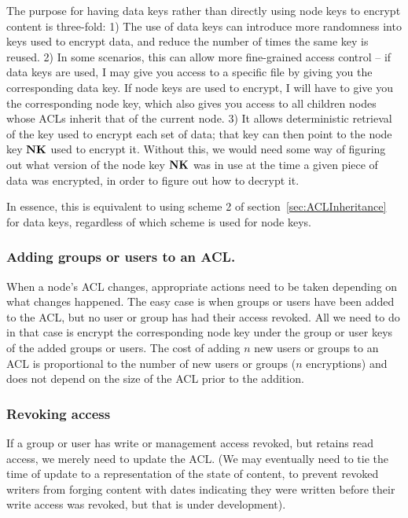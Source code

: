 The purpose for having data keys rather than directly using node keys
to encrypt content is three-fold: 1) The use of data keys can
introduce more randomness into keys used to encrypt data, and reduce
the number of times the same key is reused. 2) In some scenarios, this
can allow more fine-grained access control -- if data keys are used, I
may give you access to a specific file by giving you the corresponding
data key. If node keys are used to encrypt, I will have to give you
the corresponding node key, which also gives you access to all
children nodes whose ACLs inherit that of the current node. 3) It
allows deterministic retrieval of the key used to encrypt each set of
data; that key can then point to the node key ${\textbf{NK}}$ used to encrypt
it. Without this, we would need some way of figuring out what version
of the node key ${\textbf{NK}}$ was in use at the time a given piece of data was
encrypted, in order to figure out how to decrypt it.

In essence, this is equivalent to using scheme 2 of
section~\ref{sec:ACLInheritance} for data keys, regardless of which
scheme is used for node keys.


\subsubsection{Adding groups or users to an ACL.}
\label{sec:addingGroupOrUserToACL}

When a node's ACL changes, appropriate actions need to be taken
depending on what changes happened. The easy case is when groups or
users have been added to the ACL, but no user or group has had their
access revoked. All we need to do in that case is encrypt the
corresponding node key under the group or user keys of the added
groups or users. The cost of adding $n$ new users or groups to an ACL
is proportional to the number of new users or groups ($n$ encryptions)
and does not depend on the size of the ACL prior to the addition.


\subsubsection{Revoking access}
\label{sec:revokingAccess}

If a group or user has write or management access revoked, but retains
read access, we merely need to update the ACL. (We may eventually need
to tie the time of update to a representation of the state of content,
to prevent revoked writers from forging content with dates indicating
they were written before their write access was revoked, but that is
under development).

